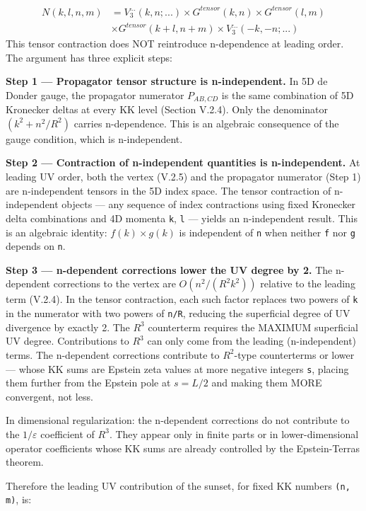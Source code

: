 \documentclass[aps,prd,preprint,superscriptaddress,longbibliography,floatfix]{revtex4-2}
\theoremstyle{remark}
\begin{document}
\begin{align}
    N(k, l, n, m) &= V_{3}^{...}(k,n; ...) \times G^{tensor}(k,n) \times G^{tensor}(l,m) \\
    & \times G^{tensor}(k+l,n+m) \times V_{3}^{...}(-k,-n; ...)
\end{align}
This tensor contraction does NOT reintroduce n-dependence at leading order. The argument has three explicit steps:

\textbf{Step 1 --- Propagator tensor structure is n-independent.} In 5D de Donder gauge, the propagator numerator $P_{AB,CD}$ is the same combination of 5D Kronecker deltas at every KK level (Section V.2.4). Only the denominator $(k^{2} + n^{2}/R^{2})$ carries n-dependence. This is an algebraic consequence of the gauge condition, which is n-independent.

\textbf{Step 2 --- Contraction of n-independent quantities is n-independent.} At leading UV order, both the vertex (V.2.5) and the propagator numerator (Step 1) are n-independent tensors in the 5D index space. The tensor contraction of n-independent objects --- any sequence of index contractions using fixed Kronecker delta combinations and 4D momenta \texttt{k}, \texttt{l} --- yields an n-independent result. This is an algebraic identity: $f(k) \times g(k)$ is independent of \texttt{n} when neither \texttt{f} nor \texttt{g} depends on \texttt{n}.

\textbf{Step 3 --- n-dependent corrections lower the UV degree by 2.} The n-dependent corrections to the vertex are $O(n^{2}/(R^{2}k^{2}))$ relative to the leading term (V.2.4). In the tensor contraction, each such factor replaces two powers of \texttt{k} in the numerator with two powers of \texttt{n/R}, reducing the superficial degree of UV divergence by exactly 2. The $R^{3}$ counterterm requires the MAXIMUM superficial UV degree. Contributions to $R^{3}$ can only come from the leading (n-independent) terms. The n-dependent corrections contribute to $R^{2}$-type counterterms or lower --- whose KK sums are Epstein zeta values at more negative integers \texttt{s}, placing them further from the Epstein pole at $s = L/2$ and making them MORE convergent, not less.

In dimensional regularization: the n-dependent corrections do not contribute to the $1/\varepsilon$ coefficient of $R^{3}$. They appear only in finite parts or in lower-dimensional operator coefficients whose KK sums are already controlled by the Epstein-Terras theorem.

Therefore the leading UV contribution of the sunset, for fixed KK numbers \texttt{(n, m)}, is:
\end{document}
